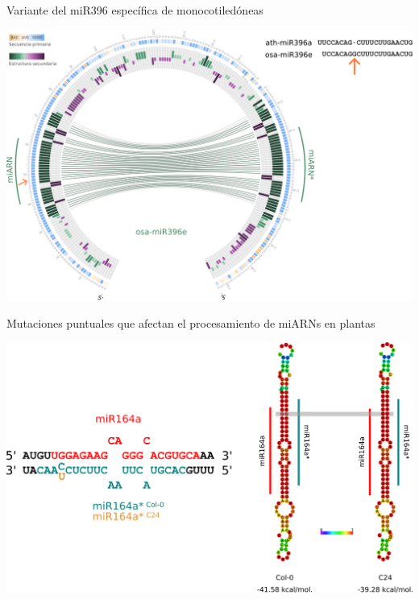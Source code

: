 \documentclass{beamer}
\begin{document}
\begin{frame}{Variante del miR396 específica de monocotiledóneas}
	\begin{center}
		\includegraphics[width=.8\textwidth]{img/circos_monocots_miR396e_defensa.png}
	\end{center}
    \begin{center}
    \end{center}
\end{frame}


\begin{frame}{Mutaciones puntuales que afectan el procesamiento de miARNs en plantas}
	\begin{center}
		\includegraphics[width=.7\textwidth]{img/miR164_ss_bp.png}
	\end{center}
\end{frame}
\end{document}
